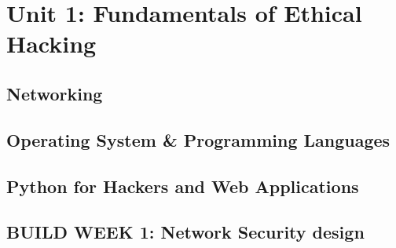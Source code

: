 \section{Unit 1: Fundamentals of Ethical Hacking}

\subsection{Networking}





\subsection{Operating System \& Programming Languages}

\subsection{Python for Hackers and Web Applications}

\subsection{BUILD WEEK 1: Network Security design}
